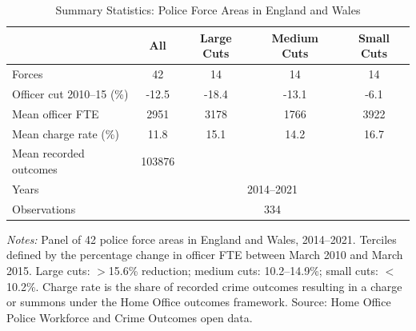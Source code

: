 \begin{table}[ht]
\centering
\caption{Summary Statistics: Police Force Areas in England and Wales}
\label{tab:sumstats}
\begin{tabular}{lcccc}
\hline\hline
 & All & Large Cuts & Medium Cuts & Small Cuts \\
\hline
Forces & 42 & 14 & 14 & 14 \\
Officer cut 2010--15 (\%) & -12.5 & -18.4 & -13.1 & -6.1 \\
Mean officer FTE & 2951 & 3178 & 1766 & 3922 \\
Mean charge rate (\%) & 11.8 & 15.1 & 14.2 & 16.7 \\
Mean recorded outcomes & 103876 & & & \\
Years & \multicolumn{4}{c}{2014--2021} \\
Observations & \multicolumn{4}{c}{334} \\
\hline\hline
\end{tabular}
\begin{minipage}{0.92\textwidth}
\vspace{3pt}
\small\textit{Notes:} Panel of 42 police force areas in England and Wales, 2014--2021. Terciles defined by the percentage change in officer FTE between March 2010 and March 2015. Large cuts: $>$15.6\% reduction; medium cuts: 10.2--14.9\%; small cuts: $<$10.2\%. Charge rate is the share of recorded crime outcomes resulting in a charge or summons under the Home Office outcomes framework. Source: Home Office Police Workforce and Crime Outcomes open data.
\end{minipage}
\end{table}

